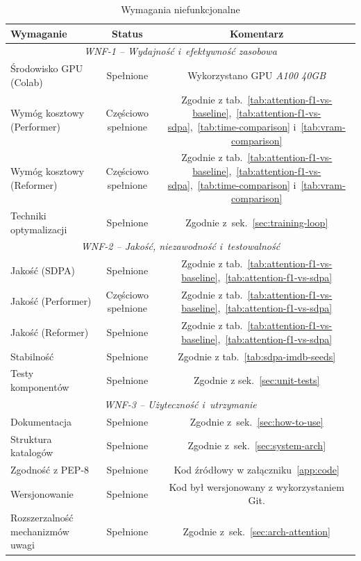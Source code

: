\documentclass[a4paper,11pt,twoside]{report}
\theoremstyle{definition}
\begin{document}
\begin{table}[h!]
\centering
\caption{Wymagania niefunkcjonalne}
\label{tab:wymagania-niefunkcjonalne}
\small
\smallskip
\begin{tabular}{@{}lcc@{}}
\toprule
\textbf{Wymaganie} & \textbf{Status} & \textbf{Komentarz} \\
\midrule
\multicolumn{3}{c}{\textit{WNF-1 -- Wydajność i~efektywność zasobowa}} \\
\midrule
Środowisko GPU (Colab) & Spełnione & Wykorzystano GPU \textit{A100 40GB}\\
Wymóg kosztowy (Performer) & Częściowo spełnione & Zgodnie z tab.~\ref{tab:attention-f1-vs-baseline},~\ref{tab:attention-f1-vs-sdpa},~\ref{tab:time-comparison} i~\ref{tab:vram-comparison}\\
Wymóg kosztowy (Reformer) & Częściowo spełnione & Zgodnie z tab.~\ref{tab:attention-f1-vs-baseline},~\ref{tab:attention-f1-vs-sdpa},~\ref{tab:time-comparison} i~\ref{tab:vram-comparison}\\
Techniki optymalizacji & Spełnione & Zgodnie z~sek.~\ref{sec:training-loop}\\
\midrule
\multicolumn{3}{c}{\textit{WNF-2 -- Jakość, niezawodność i~testowalność}} \\
\midrule
Jakość (SDPA) & Spełnione & Zgodnie z tab.~\ref{tab:attention-f1-vs-baseline},~\ref{tab:attention-f1-vs-sdpa}\\
Jakość (Performer) & Częściowo spełnione & Zgodnie z tab.~\ref{tab:attention-f1-vs-baseline},~\ref{tab:attention-f1-vs-sdpa}\\
Jakość (Reformer) & Spełnione & Zgodnie z tab.~\ref{tab:attention-f1-vs-baseline},~\ref{tab:attention-f1-vs-sdpa}\\
Stabilność & Spełnione & Zgodnie z tab.~\ref{tab:sdpa-imdb-seeds}\\
Testy komponentów & Spełnione & Zgodnie z sek.~\ref{sec:unit-tests}\\
\midrule
\multicolumn{3}{c}{\textit{WNF-3 -- Użyteczność i~utrzymanie}} \\
\midrule
Dokumentacja & Spełnione & Zgodnie z~sek.~\ref{sec:how-to-use}\\
Struktura katalogów & Spełnione & Zgodnie z~sek.~\ref{sec:system-arch}\\
Zgodność z PEP-8 & Spełnione & Kod źródłowy w załączniku~\ref{app:code} \\
Wersjonowanie & Spełnione & Kod był wersjonowany z wykorzystaniem Git. \\
Rozszerzalność mechanizmów uwagi & Spełnione & Zgodnie z~sek.~\ref{sec:arch-attention} \\

\end{tabular}
\end{table}
\end{document}
